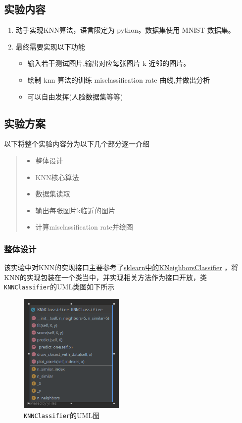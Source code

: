 \documentclass[UTF8]{ctexart}
\begin{document}

\subsection{实验内容}
\begin{enumerate}
    \item 动手实现KNN算法，语言限定为 python。数据集使用 MNIST 数据集。
    \item 最终需要实现以下功能
    \begin{itemize}
        \item 输入若干测试图片,输出对应每张图片 k 近邻的图片。
        \item 绘制 knn 算法的训练 misclassification rate 曲线,并做出分析
        \item 可以自由发挥(人脸数据集等等)
    \end{itemize}
\end{enumerate}

\subsection{实验方案}
以下将整个实验内容分为以下几个部分逐一介绍
\begin{quote}
    \begin{itemize}
        \item 整体设计
        \item KNN核心算法
        \item 数据集读取
        \item 输出每张图片k临近的图片
        \item 计算misclassification rate并绘图
    \end{itemize}
\end{quote}

\subsubsection{整体设计}
该实验中对KNN的实现接口主要参考了\href{https://scikit-learn.org/stable/modules/generated/sklearn.neighbors.KNeighborsClassifier.html}{sklearn中的KNeighborsClassifier}
，将KNN的实现包装在一个类当中，并实现相关方法作为接口开放，类 \lstinline{KNNClassifier}的UML类图如下所示

\begin{figure}[h]
    \centering
    \includegraphics[width=2in]{asset/KNNClassifier_UML.png}
    \caption{\lstinline{KNNClassifier}的UML图} %
\end{figure}
\end{document}
